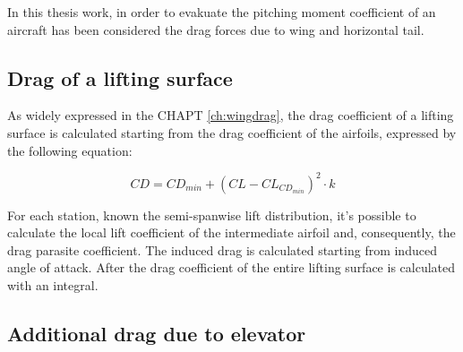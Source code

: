 In this thesis work, in order to evakuate the pitching moment coefficient of an aircraft has been considered the drag forces due to wing and horizontal tail.

\subsection{Drag of a lifting surface}

As widely expressed in the CHAPT  \ref{ch:wingdrag}, the drag coefficient of a lifting surface is calculated starting from the drag coefficient of the airfoils, expressed by the following equation:

\begin{equation}
CD = CD_{min} + (CL - CL_{CD_{min}})^2 \cdot k
\end{equation}

For each station, known the semi-spanwise lift distribution, it's possible to calculate the local lift coefficient of the intermediate airfoil and, consequently, the drag parasite coefficient. The induced drag is calculated starting from induced angle of attack. After the drag coefficient of the entire lifting surface is calculated with an integral.

\subsection{Additional drag due to elevator}

